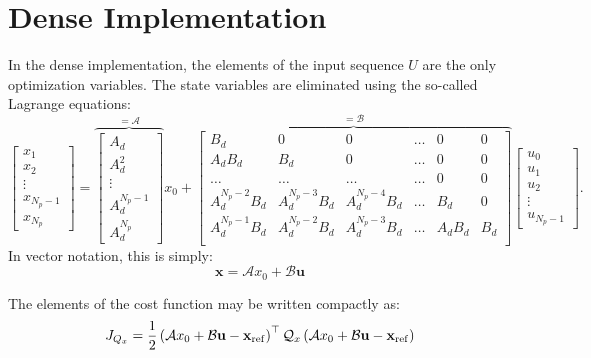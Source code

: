 \documentclass[a4paper,12pt,fleqn]{article}
\newcommand{\varxvec}{\mathbf{x}}
\newcommand{\varuvec}{\mathbf{u}}
\newcommand{\Np}{{N_p}}
\begin{document}
\section{Dense Implementation}
In the dense implementation, the elements of the input sequence $U$ are the only optimization variables.
The state variables are eliminated using the so-called Lagrange equations:
\begin{equation}
\begin{bmatrix}
x_1\\
x_2\\
\vdots\\
x_{\Np-1}\\
x_{\Np}
\end{bmatrix}=
\overbrace{
\begin{bmatrix}
A_d\\
A_d^2\\
\vdots\\
A_d^{\Np-1}\\
A_d^\Np
\end{bmatrix}
}^{=\mathcal{A}}
x_0 + 
\overbrace{
\begin{bmatrix}
 B_d                &0              &0              &\dots      &0      &0\\
 A_dB_d               &B_d            &0              &\dots      &0      &0\\
 \dots              &\dots          &\dots          &\dots     &0       &0\\
 A_d^{\Np-2}B_d       &A_d^{\Np-3}B_d   &A_d^{\Np-4}B_d   &\dots     &B_d       &0\\
 A_d^{\Np-1}B_d       &A_d^{\Np-2}B_d   &A_d^{\Np-3}B_d   &\dots     &A_dB_d      &B_d \\
\end{bmatrix}
}^{=\mathcal B}
\begin{bmatrix}
u_0\\
u_1\\
u_2\\
\vdots\\
u_{\Np-1}
\end{bmatrix}.
\end{equation}
In vector notation, this is simply:
\begin{equation}
 \varxvec = \mathcal{A}x_0 + \mathcal{B} \varuvec
\end{equation}


The elements of the cost function may be written compactly as:
\begin{equation}
 J_{Q_x} = \frac{1}{2} \left(\mathcal{A} x_0 + \mathcal{B} \varuvec - \varxvec_{\rm ref}\right)^\top \mathcal{Q}_x \left(\mathcal{A} x_0 + \mathcal{B} \varuvec - \varxvec_{\rm ref}\right)
\end{equation}
\end{document}
